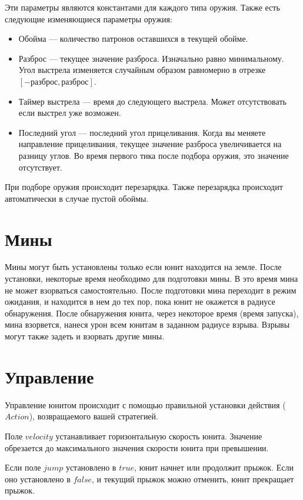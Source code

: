 Эти параметры являются константами для каждого типа оружия. Также есть следующие изменяющиеся параметры оружия:
\begin{itemize}
      \item Обойма --- количество патронов оставшихся в текущей обойме.
      \item Разброс --- текущее значение разброса. Изначально равно минимальному.
            Угол выстрела изменяется случайным образом равномерно в отрезке $[-разброс, разброс]$.
      \item Таймер выстрела --- время до следующего выстрела. Может отсутствовать если выстрел уже возможен.
      \item Последний угол --- последний угол прицеливания. Когда вы меняете направление прицеливания,
            текущее значение разброса увеличивается на разницу углов.
            Во время первого тика после подбора оружия, это значение отсутствует.
\end{itemize}

При подборе оружия происходит перезарядка.
Также перезарядка происходит автоматически в случае пустой обоймы.

\section{Мины}

Мины могут быть установлены только если юнит находится на земле.
После установки, некоторые время необходимо для подготовки мины. В это время мина не может взорваться самостоятельно.
После подготовки мина переходит в режим ожидания, и находится в нем до тех пор,
пока юнит не окажется в радиусе обнаружения.
После обнаружения юнита, через некоторое время (время запуска), мина взорвется, нанеся урон всем юнитам в заданном радиусе взрыва.
Взрывы могут также задеть и взорвать другие мины.

\section{Управление}

Управление юнитом происходит с помощью правильной установки действия ($Action$), возвращаемого вашей стратегией.

Поле $velocity$ устанавливает горизонтальную скорость юнита. Значение обрезается до максимального значения скорости юнита при превышении.

Если поле $jump$ установлено в $true$, юнит начнет или продолжит прыжок.
Если оно установлено в $false$, и текущий прыжок можно отменить, юнит прекращает прыжок.

